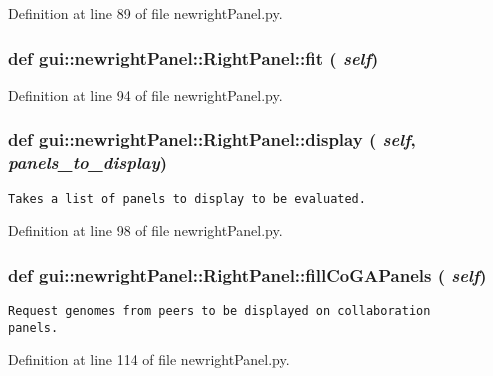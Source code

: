 Definition at line 89 of file newrightPanel.py.
\subsubsection{\setlength{\rightskip}{0pt plus 5cm}def gui::newrightPanel::RightPanel::fit ( {\em self})}\label{classgui_1_1newrightPanel_1_1RightPanel_d6aae004694c2157a25c72479e8c3f30}




Definition at line 94 of file newrightPanel.py.
\subsubsection{\setlength{\rightskip}{0pt plus 5cm}def gui::newrightPanel::RightPanel::display ( {\em self},  {\em panels\_\-to\_\-display})}\label{classgui_1_1newrightPanel_1_1RightPanel_dc3cfebd853f4db935c52cc0f41b3878}




\footnotesize\begin{verbatim}
Takes a list of panels to display to be evaluated.
\end{verbatim}
\normalsize
 

Definition at line 98 of file newrightPanel.py.
\subsubsection{\setlength{\rightskip}{0pt plus 5cm}def gui::newrightPanel::RightPanel::fillCoGAPanels ( {\em self})}\label{classgui_1_1newrightPanel_1_1RightPanel_eb37a6fe32cf2ebc2c6b70ee58b95c7c}




\footnotesize\begin{verbatim}
Request genomes from peers to be displayed on collaboration
panels.
\end{verbatim}
\normalsize
 

Definition at line 114 of file newrightPanel.py.
